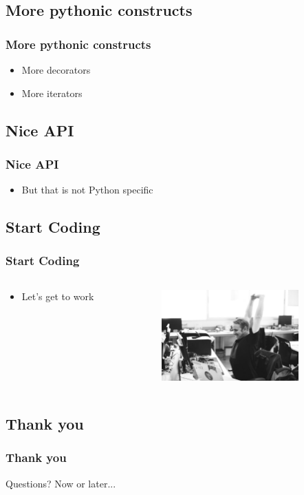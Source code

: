 \subsection{More pythonic constructs}
\begin{frame}
\frametitle{More pythonic constructs}
\begin{itemize}
	\item More decorators
	\item More iterators
\end{itemize}
\end{frame}

\subsection{Nice API}
\begin{frame}
\frametitle{Nice API}
\begin{itemize}
	\item But that is not Python specific
\end{itemize}
\end{frame}

\subsection{Start Coding}
\begin{frame}
\frametitle{Start Coding}
	\begin{columns}[T] %
		\begin{column}[T]{5cm} %
		\begin{itemize}
			\item Let's get to work
		\end{itemize}
		\end{column}
		\begin{column}[T]{5cm} %
			\includegraphics[height=3.5cm]{img/start_coding.jpg}
		\end{column}
	\end{columns}
\end{frame}

\subsection{Thank you}
\begin{frame}
\frametitle{Thank you}
Questions?
Now or later...
\end{frame}
